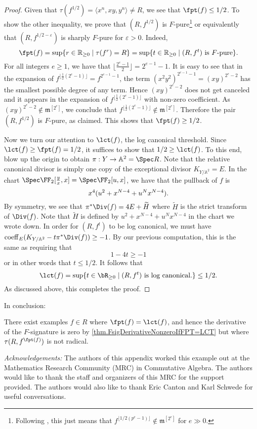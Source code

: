 \documentclass[11pt]{amsart}
\begin{document}
\begin{proof} Given that $\tau(f^{1/2}) = \langle x^n,xy,y^n \rangle \ne R$, we see that $\fpt(f) \leq 1/2$.  To show the other inequality, we prove that $(R, f^{1/2})$ is $F$-pure\footnote{Following \cite{HaraWatanabeFRegFPure}, this just means that $f^{\lfloor 1/2(p^e-1) \rfloor} \notin {\mathfrak{m}}^{[2^e]}$ for $e \gg 0$.} or equivalently that $(R, f^{1/2 - \varepsilon})$ is sharply $F$-pure for $\varepsilon > 0$.  Indeed,
\[
\displaystyle \fpt(f) = \sup \{r \in {\mathbb{R}}_{\geq 0} \mid \tau(f^r) = R\} = \sup\{t \in {\mathbb{R}}_{\geq  0} \mid (R,f^t) \mbox{ is } F\mbox{-pure}\}.
\]
For all integers $e \geq 1$, we have that $\lfloor \frac{2^e-1}{2} \rfloor = 2^{e-1}-1$. It is easy to see that in the expansion of $f^{\lfloor \frac{1}{2} (2^e-1)\rfloor } =  f^{2^{e-1}-1}$, the term $(x^2y^2)^{2^{e-1}-1} = (xy)^{2^e - 2}$ has the smallest possible degree of any term.  Hence $(xy)^{2^e - 2}$ does not get canceled and it appears in the expansion of $f^{\lfloor \frac{1}{2}(2^e-1)\rfloor }$ with non-zero coefficient.  As $(xy)^{2^e-2} \notin {\mathfrak{m}}^{[2^e]}$, we conclude that $f^{\lfloor \frac{1}{2}(2^e-1) \rfloor} \notin {\mathfrak{m}}^{[2^e]}$. Therefore the pair $(R,f^{1/2})$ is $F$-pure, as claimed.  This shows that $\fpt(f) \geq 1/2$.

Now we turn our attention to $\lct(f)$, the log canonical threshold.  Since $\lct(f) \geq \fpt(f) = 1/2$, it suffices to show that $1/2 \geq \lct(f)$.  To this end, blow up the origin to obtain $\pi : Y \to \mathbb{A}^2 = \Spec R$.  Note that the relative canonical divisor is simply one copy of the exceptional divisor $K_{Y / \mathbb{A}^2} = E$.  In the chart $\Spec \FF_2[\frac{y}{x},x] = \Spec \FF_2[u,x]$, we have that the pullback of $f$ is
\[
{\displaystyle} x^4(u^2+x^{N-4}+u^Nx^{N-4}).
\]
By symmetry, we see that $\pi^* \Div(f) = 4E + \widetilde{H}$ where $\widetilde{H}$ is the strict transform of $\Div(f)$.  Note that $\widetilde{H}$ is defined by $u^2+x^{N-4}+u^Nx^{N-4}$ in the chart we wrote down.
In order for $(R, f^{t})$ to be log canonical, we must have ${\mathrm{coeff}}_E(K_{Y / \mathbb{A}^2} - t \pi^* \Div(f)) \geq -1$.  By our previous computation, this is the same as requiring that
\[
1 - 4t \geq -1
\]
or in other words that $t \leq 1/2$.  It follows that
\[
\lct(f) = \sup\{t \in \bR_{\geq 0}\;|\; (R, f^t) \text{ is log canonical.}\} \leq 1/2.
\]
As discussed above, this completes the proof.
\end{proof}

In conclusion:

\begin{corollary}
There exist examples $f \in R$ where $\fpt(f) = \lct(f)$, and hence the derivative of the $F$-signature is zero by \autoref{thm.FsigDerivativeNonzeroIfFPT=LCT} but where $\tau(R, f^{\fpt(f)})$ is not radical.
\end{corollary}
\vskip 10pt
\noindent
{\it Acknowledgements:}  The authors of this appendix worked this example out at the Mathematics Research Community (MRC) in Commutative Algebra.  The authors would like to thank the staff and organizers of this MRC for the support provided.  The authors would also like to thank Eric Canton and Karl Schwede for useful conversations.



\end{document}
